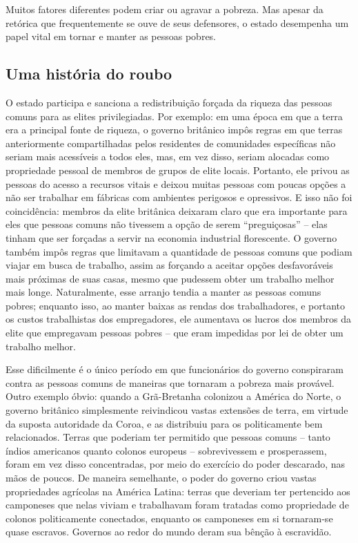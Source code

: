 Muitos fatores diferentes podem criar ou agravar a pobreza. Mas apesar da retórica que frequentemente se ouve de seus defensores, o estado desempenha um papel vital em tornar e manter as pessoas pobres.

\subsection*{Uma história do roubo}

O estado participa e sanciona a redistribuição forçada da riqueza das pessoas comuns para as elites privilegiadas. Por exemplo: em uma época em que a terra era a principal fonte de riqueza, o governo britânico impôs regras em que terras anteriormente compartilhadas pelos residentes de comunidades específicas não seriam mais acessíveis a todos eles, mas, em vez disso, seriam alocadas como propriedade pessoal de membros de grupos de elite locais. Portanto, ele privou as pessoas do acesso a recursos vitais e deixou muitas pessoas com poucas opções a não ser trabalhar em fábricas com ambientes perigosos e opressivos. E isso não foi coincidência: membros da elite britânica deixaram claro que era importante para eles que pessoas comuns não tivessem a opção de serem ``preguiçosas'' -- elas tinham que ser forçadas a servir na economia industrial florescente. O governo também impôs regras que limitavam a quantidade de pessoas comuns que podiam viajar em busca de trabalho, assim as forçando a aceitar opções desfavoráveis mais próximas de suas casas, mesmo que pudessem obter um trabalho melhor mais longe. Naturalmente, esse arranjo tendia a manter as pessoas comuns pobres; enquanto isso, ao manter baixas as rendas dos trabalhadores, e portanto os custos trabalhistas dos empregadores, ele aumentava os lucros dos membros da elite que empregavam pessoas pobres -- que eram impedidas por lei de obter um trabalho melhor.

Esse dificilmente é o único período em que funcionários do governo conspiraram contra as pessoas comuns de maneiras que tornaram a pobreza mais provável. Outro exemplo óbvio: quando a Grã-Bretanha colonizou a América do Norte, o governo britânico simplesmente reivindicou vastas extensões de terra, em virtude da suposta autoridade da Coroa, e as distribuiu para os politicamente bem relacionados. Terras que poderiam ter permitido que pessoas comuns -- tanto índios americanos quanto colonos europeus -- sobrevivessem e prosperassem, foram em vez disso concentradas, por meio do exercício do poder descarado, nas mãos de poucos. De maneira semelhante, o poder do governo criou vastas propriedades agrícolas na América Latina: terras que deveriam ter pertencido aos camponeses que nelas viviam e trabalhavam foram tratadas como propriedade de colonos politicamente conectados, enquanto os camponeses em si tornaram-se quase escravos. Governos ao redor do mundo deram sua bênção à escravidão.

